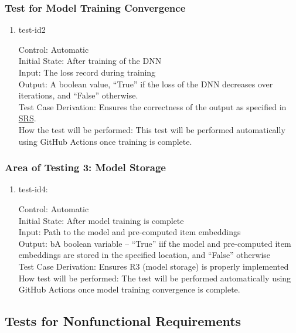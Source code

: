 \documentclass[12pt, titlepage]{article}
\begin{document}
\subsubsection{Test for Model Training Convergence}

\begin{enumerate}
  \item{test-id2\\}

  Control: Automatic\\
  Initial State: After training of the DNN\\
  Input: The loss record during training\\
  Output: A boolean value, ``True'' if the loss of the DNN decreases over iterations, and ``False'' otherwise.\\
  Test Case Derivation: Ensures the correctness of the output as specified in \href{https://github.com/V-AS/Two-tower-recommender-system/blob/main/docs/SRS/SRS.pdf}{SRS}.\\
  How the test will be performed: This test will be performed automatically using GitHub Actions once training is complete.

\end{enumerate}

\subsubsection{Area of Testing 3: Model Storage}

\begin{enumerate}
  \item{test-id4:\\}
  
  Control: Automatic\\
  Initial State: After model training is complete\\
  Input: Path to the model and pre-computed item embeddings\\
  Output: bA boolean variable -- ``True'' iif the model and pre-computed item embeddings are stored in the specified location, and ``False'' otherwise\\
  Test Case Derivation: Ensures R3 (model storage) is properly implemented\\
  How test will be performed: The test will be performed automatically using GitHub Actions once model training convergence is complete.
\end{enumerate}


\subsection{Tests for Nonfunctional Requirements}
\end{document}
